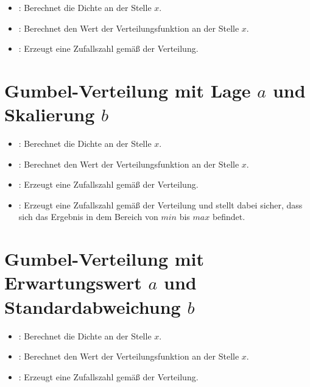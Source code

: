 \begin{itemize}

\item
{}:
Berechnet die Dichte an der Stelle $x$.

\item
{}:
Berechnet den Wert der Verteilungsfunktion an der Stelle $x$.

\item
{}:
Erzeugt eine Zufallszahl gemäß der Verteilung.

\end{itemize}



\section{Gumbel-Verteilung mit Lage \texorpdfstring{$a$}{a} und Skalierung \texorpdfstring{$b$}{b}}

\begin{itemize}

\item
{}:
Berechnet die Dichte an der Stelle $x$.

\item
{}:
Berechnet den Wert der Verteilungsfunktion an der Stelle $x$.

\item
{}:
Erzeugt eine Zufallszahl gemäß der Verteilung.

\item
{}:
Erzeugt eine Zufallszahl gemäß der Verteilung und stellt dabei sicher, dass sich das Ergebnis in dem Bereich von $min$ bis $max$ befindet.

\end{itemize}



\section{Gumbel-Verteilung mit Erwartungswert \texorpdfstring{$a$}{a} und Standardabweichung \texorpdfstring{$b$}{b}}

\begin{itemize}

\item
{}:
Berechnet die Dichte an der Stelle $x$.

\item
{}:
Berechnet den Wert der Verteilungsfunktion an der Stelle $x$.

\item
{}:
Erzeugt eine Zufallszahl gemäß der Verteilung.

\end{itemize}



